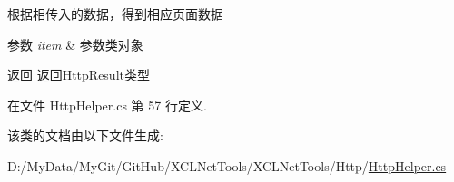 根据相传入的数据，得到相应页面数据 


\begin{DoxyParams}{参数}
{\em item} & 参数类对象\\
\hline
\end{DoxyParams}
\begin{DoxyReturn}{返回}
返回\-Http\-Result类型
\end{DoxyReturn}


在文件 Http\-Helper.\-cs 第 57 行定义.



该类的文档由以下文件生成\-:\begin{DoxyCompactItemize}
\item 
D\-:/\-My\-Data/\-My\-Git/\-Git\-Hub/\-X\-C\-L\-Net\-Tools/\-X\-C\-L\-Net\-Tools/\-Http/\hyperlink{_http_helper_8cs}{Http\-Helper.\-cs}\end{DoxyCompactItemize}
